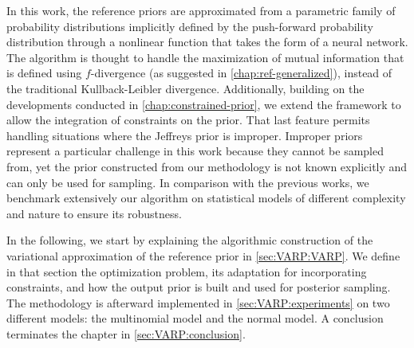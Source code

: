 In this work,
the {reference priors} are approximated from a parametric family of probability distributions implicitly defined by the push-forward probability distribution through a nonlinear function that takes the form of a neural network. %
The algorithm is thought to handle the maximization of mutual information that is defined using $f$-divergence (as suggested in \cref{chap:ref-generalized}), instead of the traditional Kullback-Leibler divergence.
Additionally, building on the developments conducted in \cref{chap:constrained-prior}, we extend the framework to allow the integration of constraints on the prior. That last feature permits handling situations where the Jeffreys prior is improper. Improper priors represent a particular challenge in this work because they cannot be sampled from, yet the prior constructed from our methodology is not known explicitly and can only be used for sampling. %
In comparison with the previous works, we benchmark extensively our algorithm on statistical models of different complexity and nature to ensure its robustness.


In the following, we start by explaining the algorithmic construction of the variational approximation of the reference prior in \cref{sec:VARP:VARP}. We define in that section the optimization problem, its adaptation for incorporating constraints,  and how the output prior is built and used for posterior sampling.
The methodology is afterward implemented in \cref{sec:VARP:experiments} on two different models: the multinomial model and the normal model.
A conclusion terminates the chapter in \cref{sec:VARP:conclusion}.









